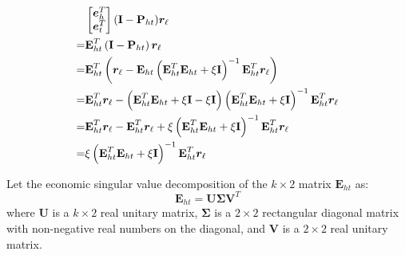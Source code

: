 \documentclass[10pt,journal]{IEEEtran}
\begin{document}
\begin{align}
 &\begin{bmatrix} \bm{e}_h^{T} \\ \bm{e}_t^{T} \end{bmatrix} (\textbf{I} -  \textbf{P}_{ht})\bm{r}_{\ell} \notag  \\
=&\textbf{E}_{ht}^{T}\left(\textbf{I} -  \textbf{P}_{ht}\right)\bm{r}_{\ell}  \notag \\
=&\textbf{E}_{ht}^{T}\left(\bm{r}_{\ell} -  \textbf{E}_{ht}\left(\textbf{E}_{ht}^{T} \textbf{E}_{ht} + \xi \textbf{I} \right)^{-1} \textbf{E}_{ht}^{T} \bm{r}_{\ell}\right)  \notag \\
=&\textbf{E}_{ht}^{T}\bm{r}_{\ell} - \left (\textbf{E}_{ht}^{T} \textbf{E}_{ht}+\xi \textbf{I} - \xi \textbf{I}\right)\left(\textbf{E}_{ht}^{T} \textbf{E}_{ht} + \xi \textbf{I}\right )^{-1} \textbf{E}_{ht}^{T} \bm{r}_{\ell} \notag \\
=& \textbf{E}_{ht}^{T}\bm{r}_{\ell} - \textbf{E}_{ht}^{T} \bm{r}_{\ell}  +  \xi \left(\textbf{E}_{ht}^{T} \textbf{E}_{ht} + \xi \textbf{I}\right )^{-1} \textbf{E}_{ht}^{T} \bm{r}_{\ell}  \notag \\
=& \xi \left(\textbf{E}_{ht}^{T} \textbf{E}_{ht} + \xi \textbf{I}\right )^{-1} \textbf{E}_{ht}^{T} \bm{r}_{\ell}   \label{temp}
\end{align}

Let the economic singular value decomposition of the $k \times 2$ matrix $\textbf{E}_{ht}$ as:
\begin{equation*}
\textbf{E}_{ht} = \textbf{U} \mathbf{\Sigma} \textbf{V}^{T}
\end{equation*}
where \textbf{U} is a $k \times 2$ real unitary matrix, $\mathbf{\Sigma}$ is a $2 \times 2$ rectangular diagonal matrix with non-negative real numbers on the diagonal, and \textbf{V} is a $2 \times 2$ real unitary matrix.
\end{document}
